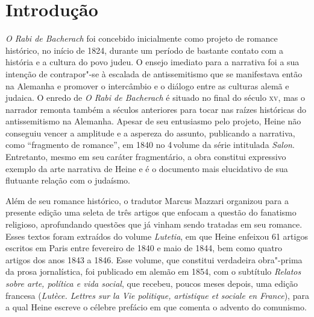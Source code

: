

\chapter{Introdução}


\textit{O Rabi de Bacherach} foi concebido inicialmente como projeto de romance histórico,
no início de 1824, durante um período de bastante
contato com a história e a cultura do povo judeu. O ensejo imediato
para a narrativa foi a sua intenção de contrapor"-se à escalada de
antissemitismo que se manifestava então na Alemanha e promover o
intercâmbio e o diálogo entre as culturas alemã e judaica. O enredo
de \textit{O Rabi de Bacherach} é situado no final do século \textsc{xv}, mas o
narrador remonta também a séculos anteriores para tocar nas raízes
históricas do antissemitismo na Alemanha. Apesar de seu entusiasmo
pelo projeto, Heine não conseguiu vencer a amplitude e a aspereza do
assunto, publicando a narrativa, como “fragmento de romance”, em 1840
no 4\oi\,volume da série intitulada \textit{Salon}. Entretanto, mesmo em seu
caráter fragmentário, a obra constitui expressivo exemplo da
arte narrativa de Heine e é o documento mais elucidativo de sua
flutuante relação com o judaísmo.

Além de seu romance histórico, o tradutor Marcus Mazzari organizou para a presente edição uma seleta de três artigos que enfocam a questão do
fanatismo religioso, aprofundando questões que já vinham sendo tratadas em seu romance.
Esses textos foram extraídos do volume \textit{Lutetia}, em
que Heine enfeixou 61 artigos escritos em Paris entre fevereiro de 1840
e maio de 1844, bem como quatro artigos dos anos 1843 a 1846. Esse
volume, que constitui verdadeira obra"-prima da prosa jornalística,
foi publicado em alemão em 1854, com o subtítulo \textit{Relatos sobre
arte, política e vida social}, que recebeu, poucos meses depois, uma edição
francesa (\textit{Lutèce. Lettres sur la Vie politique, artistique et
sociale en France}), para a qual Heine escreve o célebre prefácio em
que comenta o advento do comunismo.

